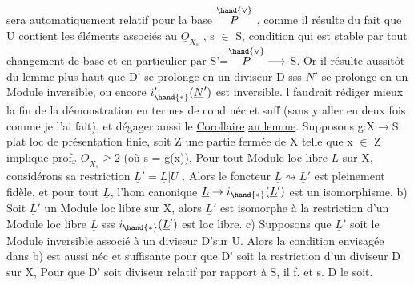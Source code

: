 
sera automatiquement  relatif pour la base $\overset{\hand{\vee}}{P}$ , comme il
résulte du fait que U contient les éléments associés au $\underline{O}_{X_s}$ , s $\in$ S,
condition qui est stable par tout changement de base et en particulier
par S'=$\overset{\hand{\vee}}{P} \longrightarrow$ S. Or il résulte aussitôt du lemme  plus haut que D' se
prolonge en un diviseur  D \uline{sss} $\underline{N}'$ se prolonge en un Module
inversible, ou encore $i'_{\hand{*}}(\underline{N}')$ est inversible.  l faudrait rédiger
mieux la fin de la démonstration en termes de cond néc et suff (sans y
aller en deux fois comme je l'ai fait), et dégager aussi  le
\uline{Corollaire}  \uline{au lemme}. Supposons g:X$\to$S plat loc de présentation finie,
soit Z une partie fermée de X telle que x $\in$ Z implique prof$_x$ $\underline{O}_{X_s} \geq 2$
(où s = g(x)), 
 Pour tout Module loc libre  $\underline{L}$ sur X,
considérons sa restriction $\underline{L}' = \underline{L}|U$ . Alors  le foncteur $\underline{L} \rightsquigarrow \underline{L}'$ est
pleinement fidèle, et pour  tout $\underline{L}$, 
l'hom canonique $\underline{L} \to i_{\hand{*}}(\underline{L}')$ est un isomorphisme.  \hand{(} b) Soit $\underline{L}'$ un
Module loc libre sur X, alors $\underline{L}'$ est isomorphe à la restriction d'un
Module loc libre $\underline{L}$ sss $i_{\hand{*}}(\underline{L}')$ est loc libre. c) Supposons que $\underline{L}'$ soit
le Module inversible associé à un diviseur  D'\hand{/}sur U. Alors
la condition envisagée dans b) est aussi néc et suffisante pour que D'
soit la restriction d'un diviseur  D sur X,  \hand{|} Pour que D' soit
diviseur  relatif par rapport à S, il f. et s.  D le soit.

